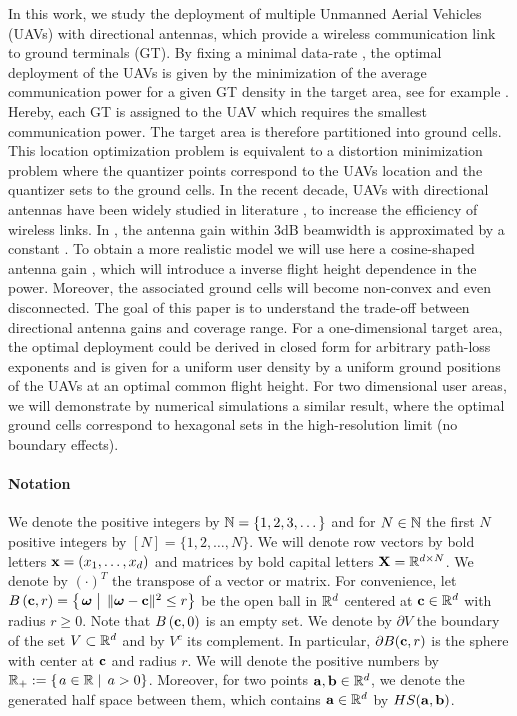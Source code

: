 \documentclass[smallabstract,smallcaptions]{dccpaper}
\newcounter{example}[section]
\newcommand{\Ball}{\ensuremath{B}}          %
\newcommand{\philippstart}{\color{black}}
\newcommand{\philippend}{\color{black}}
\begin{document}
%
In this work, we study the deployment of multiple Unmanned Aerial Vehicles (UAVs) with directional antennas, which provide a wireless communication link to ground terminals (GT).
By fixing a minimal data-rate , the optimal deployment of the UAVs is given by the minimization of the average communication power for a given GT density in the target area, see for example \cite{Erdem}. Hereby, each GT is assigned to the UAV which requires the smallest communication power. The target area is therefore partitioned into ground cells. 
This location optimization problem is equivalent to a distortion minimization problem where the quantizer points correspond to the UAVs location and the quantizer sets to the ground cells.
In the recent decade, UAVs with directional antennas have been widely studied in literature
\cite{BJL,MSF,HA,KMR,HSYR,MWMM}, to increase the efficiency of wireless links.   In \cite{BJL,MSF,HA,KMR,HSYR,MWMM}, the antenna gain within 3dB beamwidth is
approximated by a constant \cite{CAB4}. To obtain a more realistic model we will use here a cosine-shaped antenna gain \cite{CAB2}, which will introduce a inverse flight height dependence in the power.
Moreover, the associated ground cells will become non-convex and even disconnected. 
The goal of this paper is to understand the trade-off between directional antenna gains and coverage range. For a one-dimensional target area, the optimal deployment could be derived in closed form for arbitrary path-loss exponents and is given for a uniform user density by a uniform ground positions of the UAVs at an optimal common flight height. For two dimensional user areas, we will demonstrate by numerical simulations a similar result, where the optimal ground cells correspond to hexagonal sets in the high-resolution limit (no boundary effects). 

\philippstart \paragraph{Notation} We denote the positive integers by ${\mathbb N}=\{1,2,3,\dots\}$ and for $N\in{\ensuremath{\mathbb N}}$ the first
$N$ positive integers by $[N]=\{1,2,\dots,N\}$. We will denote row vectors by bold letters ${\mathbf x}=(x_1,\dots,x_d)$ and
matrices by bold capital letters ${\mathbf X}={\mathbb R}^{d\times N}$. We denote by $(\cdot)^T$ the transpose of a vector or matrix.
For convenience, let $\Ball\left(\vc,r\right)=\set{\vome}{\|\vome-\vc\|^2\le r}$ be the open ball in ${\mathbb R}^d$ centered at
${\mathbf c}\in{\ensuremath{\mathbb R}}^d$ with radius $r\geq 0$. Note that $\Ball\left(\vc,0\right)$ is an empty set. We denote by $\partial V$ the
boundary of the set $V\subset{\ensuremath{\mathbb R}}^d$ and by $V^c$ its complement. In particular, $\partial \Ball(\vc,r)$ is the sphere
with center at ${\mathbf c}$ and radius $r$. We will denote the positive numbers by $\R_+:=\set{a\in\R}{a>0}$.
%
Moreover, for two points ${\mathbf a},{\mathbf b}\in{\ensuremath{\mathbb R}}^d$, we denote the generated half space between them, which contains ${\mathbf a}\in{\ensuremath{\mathbb R}}^d$
by $HS({\mathbf a}, {\mathbf b})$.  \philippend
\end{document}
